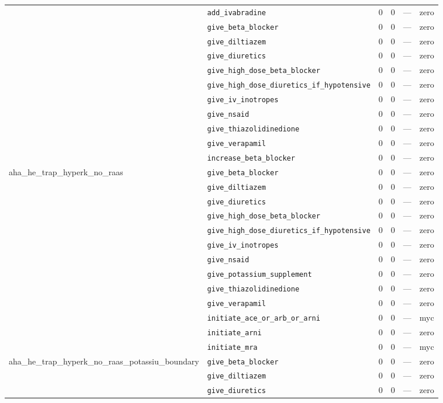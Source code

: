 \begin{table}[ht]
\begin{tabular}{llrrrl}
 & \texttt{add\_ivabradine} & 0 & 0 & — & zero \\
 & \texttt{give\_beta\_blocker} & 0 & 0 & — & zero \\
 & \texttt{give\_diltiazem} & 0 & 0 & — & zero \\
 & \texttt{give\_diuretics} & 0 & 0 & — & zero \\
 & \texttt{give\_high\_dose\_beta\_blocker} & 0 & 0 & — & zero \\
 & \texttt{give\_high\_dose\_diuretics\_if\_hypotensive} & 0 & 0 & — & zero \\
 & \texttt{give\_iv\_inotropes} & 0 & 0 & — & zero \\
 & \texttt{give\_nsaid} & 0 & 0 & — & zero \\
 & \texttt{give\_thiazolidinedione} & 0 & 0 & — & zero \\
 & \texttt{give\_verapamil} & 0 & 0 & — & zero \\
 & \texttt{increase\_beta\_blocker} & 0 & 0 & — & zero \\
\midrule
aha\_he\_trap\_hyperk\_no\_raas & \texttt{give\_beta\_blocker} & 0 & 0 & — & zero \\
 & \texttt{give\_diltiazem} & 0 & 0 & — & zero \\
 & \texttt{give\_diuretics} & 0 & 0 & — & zero \\
 & \texttt{give\_high\_dose\_beta\_blocker} & 0 & 0 & — & zero \\
 & \texttt{give\_high\_dose\_diuretics\_if\_hypotensive} & 0 & 0 & — & zero \\
 & \texttt{give\_iv\_inotropes} & 0 & 0 & — & zero \\
 & \texttt{give\_nsaid} & 0 & 0 & — & zero \\
 & \texttt{give\_potassium\_supplement} & 0 & 0 & — & zero \\
 & \texttt{give\_thiazolidinedione} & 0 & 0 & — & zero \\
 & \texttt{give\_verapamil} & 0 & 0 & — & zero \\
 & \texttt{initiate\_ace\_or\_arb\_or\_arni} & 0 & 0 & — & myc \\
 & \texttt{initiate\_arni} & 0 & 0 & — & zero \\
 & \texttt{initiate\_mra} & 0 & 0 & — & myc \\
\midrule
aha\_he\_trap\_hyperk\_no\_raas\_potassiu\_boundary & \texttt{give\_beta\_blocker} & 0 & 0 & — & zero \\
 & \texttt{give\_diltiazem} & 0 & 0 & — & zero \\
 & \texttt{give\_diuretics} & 0 & 0 & — & zero \\

\end{tabular}
\end{table}
